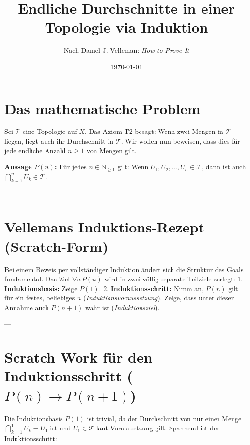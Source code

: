 \documentclass{article}
\title{Endliche Durchschnitte in einer Topologie via Induktion}
\author{Nach Daniel J. Velleman: \emph{How to Prove It}}
\date{\today}
\begin{document}
\maketitle

\section*{Das mathematische Problem}

Sei $\mathcal{T}$ eine Topologie auf $X$. Das Axiom T2 besagt: Wenn zwei Mengen in $\mathcal{T}$ liegen, liegt auch ihr Durchschnitt in $\mathcal{T}$. Wir wollen nun beweisen, dass dies für jede endliche Anzahl $n \ge 1$ von Mengen gilt.

\textbf{Aussage $P(n)$:} Für jedes $n \in \mathbb{N}_{\ge 1}$ gilt: Wenn $U_1, U_2, \dots, U_n \in \mathcal{T}$, dann ist auch $\bigcap_{k=1}^n U_k \in \mathcal{T}$.

---

\section*{Vellemans Induktions-Rezept (Scratch-Form)}

Bei einem Beweis per vollständiger Induktion ändert sich die Struktur des Goals fundamental. Das Ziel $\forall n \, P(n)$ wird in zwei völlig separate Teilziele zerlegt:
1. \textbf{Induktionsbasis:} Zeige $P(1)$.
2. \textbf{Induktionsschritt:} Nimm an, $P(n)$ gilt für ein festes, beliebiges $n$ (\emph{Induktionsvoraussetzung}). Zeige, dass unter dieser Annahme auch $P(n+1)$ wahr ist (\emph{Induktionsziel}).

---

\section*{Scratch Work für den Induktionsschritt ($P(n) \rightarrow P(n+1)$)}

Die Induktionsbasis $P(1)$ ist trivial, da der Durchschnitt von nur einer Menge $\bigcap_{k=1}^1 U_k = U_1$ ist und $U_1 \in \mathcal{T}$ laut Voraussetzung gilt. Spannend ist der Induktionsschritt:
\end{document}
